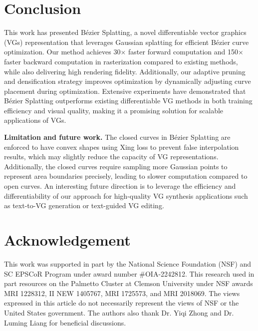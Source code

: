 \vspace{-.5em}
\section{Conclusion}
\vspace{-.5em}

This work has presented Bézier Splatting, a novel differentiable vector graphics (VGs) representation that leverages Gaussian splatting for efficient Bézier curve optimization. Our method achieves 30$\times$ faster forward computation and 150$\times$ faster backward computation in rasterization compared to existing methods, while also delivering high rendering fidelity. Additionally, our adaptive pruning and densification strategy improves optimization by dynamically adjusting curve placement during optimization. Extensive experiments have demonstrated that Bézier Splatting outperforms existing differentiable VG methods in both training efficiency and visual quality, making it a promising solution for scalable applications of VGs. 

\noindent\textbf{Limitation and future work.}
The closed curves in Bézier Splatting are enforced to have convex shapes using Xing loss \cite{xu2022live} to prevent false interpolation results, which may slightly reduce the capacity of VG representations. Additionally, the closed curves require sampling more Gaussian points to represent area boundaries precisely, leading to slower computation compared to open curves.
An interesting future direction is to leverage the efficiency and differentiability of our approach for high-quality VG synthesis applications such as text-to-VG generation or text-guided VG editing.

\section{Acknowledgement}
This work was supported in part by the National Science Foundation (NSF) and SC EPSCoR Program under award number 
\#OIA-2242812.
This research used in part resources on the Palmetto Cluster at Clemson University under NSF awards MRI 1228312, II NEW 1405767, MRI 1725573, and MRI 2018069. The views expressed in this article do not necessarily represent the views of NSF or the United States government. The authors also thank Dr. Yiqi Zhong and Dr. Luming Liang  for beneficial discussions.